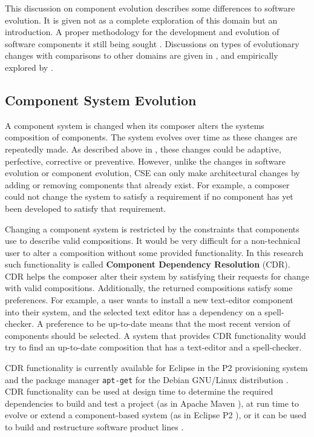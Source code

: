 This discussion on component evolution describes some differences to software evolution.
It is given not as a complete exploration of this domain but an introduction. 
A proper methodology for the development and evolution of software components it still being sought \citep{Szyperski2002}.
Discussions on types of evolutionary changes with comparisons to other domains are given in \citep{Papazoglou2011},
and empirically explored by \cite{vasa2007patterns}.

\subsection{Component System Evolution}
A component system is changed when its composer alters the systems composition of components.
The system evolves over time as these changes are repeatedly made.
As described above in \citep{IsoIec2006}, these changes could be adaptive, perfective, corrective or preventive.
However, unlike the changes in software evolution or component evolution, CSE can only make architectural changes by adding or removing components that already exist.
For example, a composer could not change the system to satisfy a requirement if no component has yet been developed to satisfy that requirement.

Changing a component system is restricted by the constraints that components use to describe valid compositions. 
It would be very difficult for a non-technical user to alter a composition without some provided functionality.
In this research such functionality is called  \textbf{Component Dependency Resolution} (CDR).
CDR helps the composer alter their system by satisfying their requests for change with valid compositions.
Additionally, the returned compositions satisfy some preferences.
For example, a user wants to install a new text-editor component into their system, and the selected text editor has a dependency on a spell-checker.
A preference to be up-to-date means that the most recent version of components should be selected.
A system that provides CDR functionality would try to find an up-to-date composition that has a text-editor and a spell-checker.

CDR functionality is currently available for Eclipse in the P2 provisioning system \citep{leBerre2010}
and the package manager \texttt{apt-get} for the Debian GNU/Linux distribution \citep{Barth2005}.
CDR functionality can be used at design time to determine the required dependencies to build and test a project (as in Apache Maven \citep{casey_better_2008}),
at run time to evolve or extend a component-based system (as in Eclipse P2 \citep{leBerre2010}),
or it can be used to build and restructure software product lines \citep{savolainen_analyzing_2007}.


